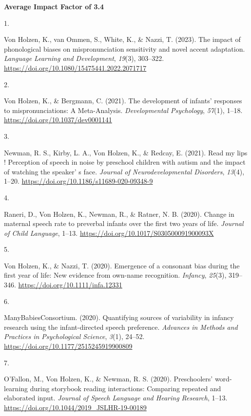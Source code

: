 \documentclass[10pt,a4paper,]{article}
\newlength{\cslhangindent}
\newlength{\csllabelwidth}
\newcommand{\CSLLeftMargin}[1]{\parbox[t]{\csllabelwidth}{\hfill #1~}}
\newcommand{\CSLRightInline}[1]{\parbox[t]{\linewidth - \cslhangindent - \csllabelwidth}{#1}\vspace{0.8ex}}
\begin{document}
\textbf{Average Impact Factor of 3.4}

\hypertarget{bibliography}{}
\leavevmode{}%
\CSLLeftMargin{1. }%
\CSLRightInline{Von Holzen, K., van Ommen, S., White, K., \& Nazzi, T.
(2023). The impact of phonological biases on mispronunciation
sensitivity and novel accent adaptation. \emph{Language Learning and
Development}, \emph{19}(3), 303--322.
\url{https://doi.org/10.1080/15475441.2022.2071717}}

\leavevmode{}%
\CSLLeftMargin{2. }%
\CSLRightInline{Von Holzen, K., \& Bergmann, C. (2021). The development
of infants' responses to mispronunciations: A Meta-Analysis.
\emph{Developmental Psychology}, \emph{57}(1), 1--18.
\url{https://doi.org/10.1037/dev0001141}}

\leavevmode{}%
\CSLLeftMargin{3. }%
\CSLRightInline{Newman, R. S., Kirby, L. A., Von Holzen, K., \& Redcay,
E. (2021). Read my lips ! Perception of speech in noise by preschool
children with autism and the impact of watching the speaker' s face.
\emph{Journal of Neurodevelopmental Disorders}, \emph{13}(4), 1--20.
\url{https://doi.org/10.1186/s11689-020-09348-9}}

\leavevmode{}%
\CSLLeftMargin{4. }%
\CSLRightInline{Raneri, D., Von Holzen, K., Newman, R., \& Ratner, N. B.
(2020). Change in maternal speech rate to preverbal infants over the
first two years of life. \emph{Journal of Child Language}, 1--13.
\url{https://doi.org/10.1017/S030500091900093X}}

\leavevmode{}%
\CSLLeftMargin{5. }%
\CSLRightInline{Von Holzen, K., \& Nazzi, T. (2020). Emergence of a
consonant bias during the first year of life: New evidence from own-name
recognition. \emph{Infancy}, \emph{25}(3), 319--346.
\url{https://doi.org/10.1111/infa.12331}}

\leavevmode{}%
\CSLLeftMargin{6. }%
\CSLRightInline{ManyBabiesConsortium. (2020). Quantifying sources of
variability in infancy research using the infant-directed speech
preference. \emph{Advances in Methods and Practices in Psychological
Science}, \emph{3}(1), 24--52.
\url{https://doi.org/10.1177/2515245919900809}}

\leavevmode{}%
\CSLLeftMargin{7. }%
\CSLRightInline{O'Fallon, M., Von Holzen, K., \& Newman, R. S. (2020).
Preschoolers' word-learning during storybook reading interactions:
Comparing repeated and elaborated input. \emph{Journal of Speech
Language and Hearing Research}, 1--13.
\url{https://doi.org/10.1044/2019_JSLHR-19-00189}}
\end{document}
